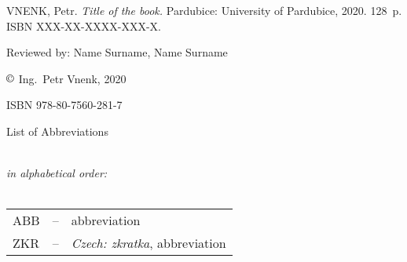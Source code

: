 \documentclass[11pt,b5paper,twoside]{report}										%
\begin{document}
\vspace{10 cm}
VNENK, Petr. \textit{Title of the book.} Pardubice: University of Pardubice, 2020. 128~p. ISBN XXX-XX-XXXX-XXX-X.

\vspace{2 cm}
Reviewed by: Name Surname, Name Surname									%

$ \copyright $ Ing.~Petr Vnenk, 2020									%

ISBN 978-80-7560-281-7													%
\thispagestyle{empty}																%


\newpage																			%
\begingroup
\tableofcontents																	%
\endgroup


\newpage																			%
\vspace*{1.32 cm}
\begin{fontoflistofabbreviations}													%
	List of Abbreviations
\end{fontoflistofabbreviations}
\vspace{1.65 cm}\\
\textit{in alphabetical order:}\\
\\
\begin{tabular}{ p{2cm} p{0.5cm} p{10.5cm} }
	ABB & -- & abbreviation\\ [1.242ex]
	ZKR & -- & \textit{Czech: zkratka}, abbreviation\\ [1.242ex]
\end{tabular}


\newpage																			%
\listoffigures																		%

\end{document}
